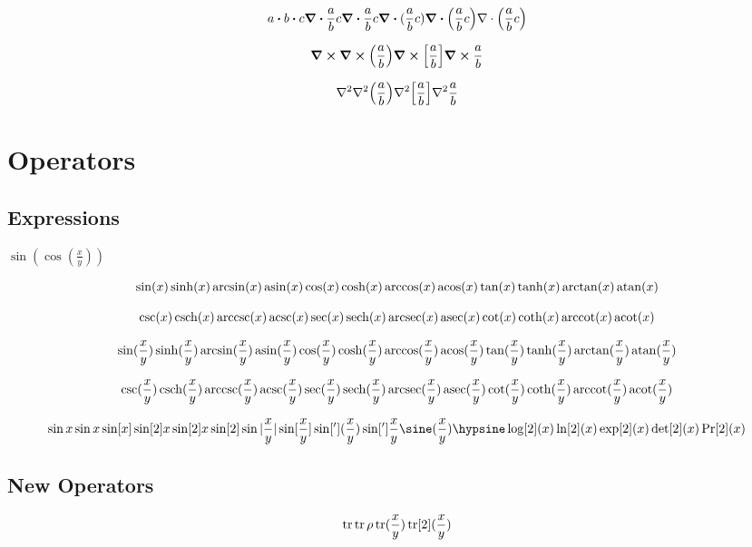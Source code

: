 \documentclass{article}
\begin{document}
\[
  a\dotproduct b \vdot c
  \divergence{\frac{a}{b}c}
  \div{\frac{a}{b}c}
  \div{(\frac{a}{b}c)}
  \div(\frac{a}{b}c)
  {\bf\nabla} \cdot \left(\frac{a}{b}c\right)
\]

\[
  \curl 
  \curl(\frac{a}{b})
  \curl[\frac{a}{b}]
  \curl{\frac{a}{b}}
\]

\[
  \laplacian 
  \laplacian(\frac{a}{b})
  \laplacian[\frac{a}{b}]
  \laplacian{\frac{a}{b}}
\]

\newpage

\section*{Operators}

\subsection*{Expressions}


$\sin(\cos(\frac{x}{y}))$

\[
  \sin(x)
  \sinh(x)
  \arcsin(x)
  \asin(x)
  \cos(x)
  \cosh(x)
  \arccos(x)
  \acos(x)
  \tan(x)
  \tanh(x)
  \arctan(x)
  \atan(x)
\]

\[
  \csc(x)
  \csch(x)
  \arccsc(x)
  \acsc(x)
  \sec(x)
  \sech(x)
  \arcsec(x)
  \asec(x)
  \cot(x)
  \coth(x)
  \arccot(x)
  \acot(x)
\]

\[
  \sin(\frac{x}{y})
  \sinh(\frac{x}{y})
  \arcsin(\frac{x}{y})
  \asin(\frac{x}{y})
  \cos(\frac{x}{y})
  \cosh(\frac{x}{y})
  \arccos(\frac{x}{y})
  \acos(\frac{x}{y})
  \tan(\frac{x}{y})
  \tanh(\frac{x}{y})
  \arctan(\frac{x}{y})
  \atan(\frac{x}{y})
\]

\[
  \csc(\frac{x}{y})
  \csch(\frac{x}{y})
  \arccsc(\frac{x}{y})
  \acsc(\frac{x}{y})
  \sec(\frac{x}{y})
  \sech(\frac{x}{y})
  \arcsec(\frac{x}{y})
  \asec(\frac{x}{y})
  \cot(\frac{x}{y})
  \coth(\frac{x}{y})
  \arccot(\frac{x}{y})
  \acot(\frac{x}{y})
\]

\[
  \sin x
  \sin{x}
  \sin[x]
  \sin[2]{x}
  \sin[2]x
  \sin[2]
  \sin|\frac{x}{y}|
  \sin[\frac{x}{y}]
  \sin['](\frac{x}{y})
  \sin[']{\frac{x}{y}}
  \sine(\frac{x}{y})
  \hypsine
  \log[2](x)
  \ln[2](x)
  \exp[2](x)
  \det[2](x)
  \Pr[2](x)
\]

\newpage
\subsection*{New Operators}

\[
  \tr
  \tr\rho
  \tr(\frac{x}{y})
  \tr[2](\frac{x}{y})
\]
\end{document}
